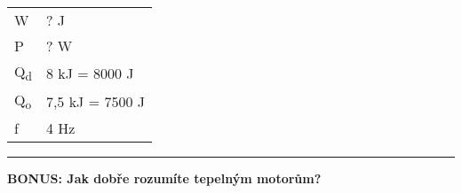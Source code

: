 \documentclass[../main.tex]{subfiles}
\begin{document}
\begin{enumerate}[label={\textbf{\arabic*.}}, resume]
    \begin{minipage}[]{0.5\textwidth}
        \begin{center}
            \textcolor{red}{
            \begin{tabular}{l l}
                W & ? J\\
                P & ? W\\
                Q\textsubscript{d} & 8 kJ = 8000 J\\
                Q\textsubscript{o} & 7,5 kJ = 7500 J\\
                f & 4 Hz
            \end{tabular}
            }
        \end{center}
    \end{minipage}%
    \begin{minipage}{0.5\textwidth}
    \end{minipage}

    \dotfill
    
    \hrule
\end{enumerate}
\begin{minipage}{0.5\textwidth}
    \textbf{BONUS: Jak dobře rozumíte tepelným motorům?}
\end{minipage}
\hfill
\begin{minipage}{0.4\textwidth}
    \begin{tcolorbox}[colframe=black, colback=white, boxrule=0.6pt]
        \Large{\frownie}
        \hfill
        \hfill
        \Large{\smiley} 
    \end{tcolorbox}
\end{minipage}
\restoregeometry
\end{document}
